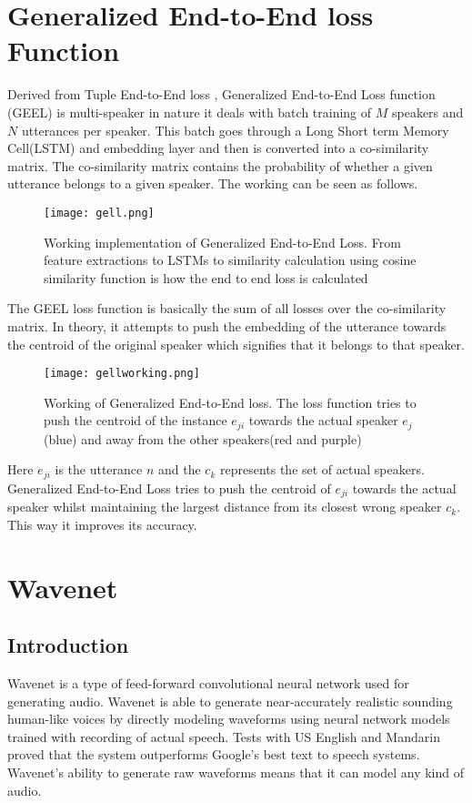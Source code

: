 \documentclass[runningheads]{llncs}
\begin{document}
\section{Generalized End-to-End loss Function}
Derived from Tuple End-to-End loss \cite{ref_paper1}, Generalized End-to-End Loss function (GEEL) is multi-speaker in nature it deals with batch training of $M$ speakers and $N$ utterances per speaker. This batch goes through a Long Short term Memory Cell(LSTM) and embedding layer and then is converted into a co-similarity matrix. The co-similarity matrix contains the probability of whether a given utterance belongs to a given speaker. The working can be seen as follows.
\newpage
\begin{figure}
\centering
\texttt{[image: gell.png]}
\caption{Working implementation of Generalized End-to-End Loss. From feature extractions to LSTMs to similarity calculation using cosine similarity function is how the end to end loss is calculated \cite{ref_paper1}}
\end{figure}

The GEEL loss function is basically the sum of all losses over the co-similarity matrix. In theory, it attempts to push the embedding of the utterance towards the centroid of the original speaker which signifies that it belongs to that speaker.

\begin{figure}
\centering
\texttt{[image: gellworking.png]}
\caption{ Working of Generalized End-to-End loss. The loss function tries to push the centroid of the instance $e_{ji}$ towards the actual speaker $e_j$ (blue) and away from the other speakers(red and purple) \cite{ref_paper1}}
\end{figure}

Here $e_{ji}$ is the utterance $n$ and the $c_k$ represents the set of actual speakers. Generalized End-to-End Loss tries to push the centroid of $e_{ji}$ towards the actual speaker whilst maintaining the largest distance from its closest wrong speaker $c_k$. This way it improves its accuracy.


\section{Wavenet}
\subsection{Introduction}
Wavenet\cite{ref_paper2} is a type of feed-forward convolutional neural network used for generating audio. Wavenet is able to generate near-accurately realistic sounding human-like voices by directly modeling waveforms using neural network models trained with recording of actual speech. Tests with US English and Mandarin proved that the system outperforms Google’s best text to speech systems. Wavenet’s ability to generate raw waveforms means that it can model any kind of audio. 
\end{document}
